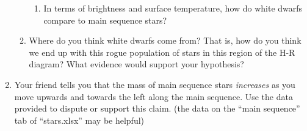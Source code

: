 \documentclass[11pt]{article}
\begin{document}
\begin{enumerate}
\begin{enumerate}
\begin{enumerate}
            \item In terms of brightness and surface temperature, how do white dwarfs compare to main sequence stars?
        \end{enumerate}
        
        \item Where do you think white dwarfs come from? That is, how do you think we end up with this rogue population of stars in this region of the H-R diagram? What evidence would support your hypothesis?
    \end{enumerate}
    
    
    \item Your friend tells you that the mass of main sequence stars \emph{increases} as you move upwards and towards the left along the main sequence. Use the data provided to dispute or support this claim. (the data on the ``main sequence'' tab of ``stars.xlsx'' may be helpful)
     
    
\end{enumerate} 
\end{document}
